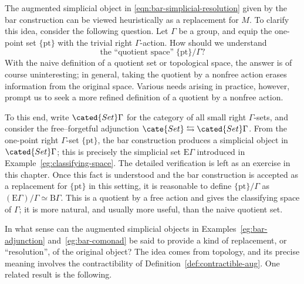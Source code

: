 
The augmented simplicial object in
\eqref{eqn:bar-simplicial-resolution} given by the bar construction can be
viewed heuristically as a replacement for $M$. To clarify this idea, consider
the following question. Let $\Gamma$ be a group, and equip the one-point set
$\{\mathrm{pt}\}$ with the trivial right $\Gamma$-action. How should we
understand
\[ \text{the ``quotient space''}\; \{\mathrm{pt}\} / \Gamma ? \]
With the naive definition of a quotient set or topological space, the answer
is of course uninteresting; in general, taking the quotient by a nonfree
action erases information from the original space. Various needs arising in
practice, however, prompt us to seek a more refined definition of a quotient
by a nonfree action.

To this end, write $\cated{Set}\Gamma$ for the category of all small right
$\Gamma$-sets, and consider the free--forgetful adjunction
$\cate{Set}\leftrightarrows\cated{Set}\Gamma$. From the one-point right
$\Gamma$-set $\{\mathrm{pt}\}$, the bar construction produces a simplicial
object in $\cated{Set}\Gamma$; this is precisely the simplicial set
$\mathrm{E}\Gamma$ introduced in Example~\ref{eg:classifying-space}. The
detailed verification is left as an exercise in this chapter. Once this fact
is understood and the bar construction is accepted as a replacement for
$\{\mathrm{pt}\}$ in this setting, it is reasonable to define
$\{\mathrm{pt}\}/\Gamma$ as
$(\mathrm{E}\Gamma)/\Gamma\simeq\mathrm{B}\Gamma$. This is a quotient by a
free action and gives the classifying space of $\Gamma$; it is more natural,
and usually more useful, than the naive quotient set.

In what sense can the augmented simplicial objects in
Examples~\ref{eg:bar-adjunction} and~\ref{eg:bar-comonad} be said to provide a
kind of replacement, or ``resolution'', of the original object? The idea
comes from topology, and its precise meaning involves the contractibility of
Definition~\ref{def:contractible-aug}. One related result is the following.


